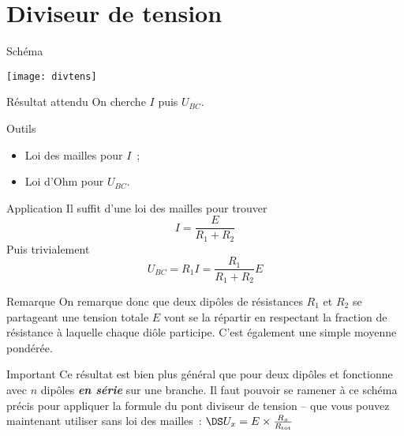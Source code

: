 \documentclass[a4paper, 12pt, final, garamond]{book}
\begin{document}
\section{Diviseur de tension}
\begin{tcbraster}[raster columns=3, raster equal height=rows]
    \begin{NCdefi}{Schéma}
        \begin{center}
            \texttt{[image: divtens]}
        \end{center}
    \end{NCdefi}
    \begin{tcolorbox}[blankest, raster multicolumn=1, space to=\myspace]
        \begin{tcbraster}[raster columns=1]
            \begin{NCprop}{Résultat attendu}
                On cherche $I$ puis $U_{BC}$.
            \end{NCprop}
            \begin{NCrapp}[add to natural height=\myspace]{Outils}
                \begin{itemize}[leftmargin=10pt]
                    \item Loi des mailles pour $I$~;
                    \item Loi d'Ohm pour $U_{BC}$.
                \end{itemize}
            \end{NCrapp}
        \end{tcbraster}
    \end{tcolorbox}
    \begin{NCexem}{Application}
        Il suffit d'une loi des mailles pour trouver
        \[I = \frac{E}{R_1+R_2}\]
        Puis trivialement
        \[U_{BC} = R_1I = \frac{R_1}{R_1+R_2}E\]
    \end{NCexem}
\end{tcbraster}
\begin{tcbraster}[raster columns=2, raster equal height=rows]
    \begin{NCrema}{Remarque}
        On remarque donc que deux dipôles de résistances $R_1$ et $R_2$ se
        partageant une tension totale $E$ vont se la répartir
        en respectant la fraction de résistance à laquelle chaque diôle
        participe. C'est également une simple moyenne pondérée.
    \end{NCrema}
    \begin{NCror}{Important}
        Ce résultat est bien plus général que pour deux dipôles et fonctionne
        avec $n$ dipôles \textbf{\textit{en série}} sur une branche. Il faut
        pouvoir se ramener à ce schéma précis pour appliquer la formule du pont
        diviseur de tension – que vous pouvez maintenant utiliser sans loi des
        mailles~: $\DS U_x = E\times \frac{R_x}{R_\mathrm{tot}}$
    \end{NCror}
\end{tcbraster}
\end{document}
